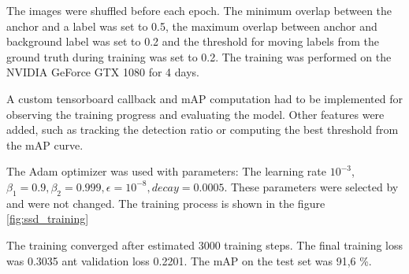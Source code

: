 \documentclass[a4paper,11pt,titlepage,twoside]{article}
\numberwithin{figure}{section}
\begin{document}
The images were shuffled before each epoch. The minimum overlap between the anchor and a label was set to 0.5, the maximum overlap between anchor and background label was set to 0.2 and the threshold for moving labels from the ground truth during training was set to 0.2. The training was performed on the NVIDIA GeForce GTX 1080 for 4 days.

A custom tensorboard callback and mAP computation had to be implemented for observing the training progress and evaluating the model. Other features were added, such as tracking the detection ratio or computing the best threshold from the mAP curve. 

The Adam optimizer \cite{kingma2014adam} was used with parameters: The learning rate $10^{-3}$, $\beta_1 = 0.9, \beta_2 = 0.999, \epsilon=10^{-8}, decay = 0.0005$. These parameters were selected by \cite{ssd_keras} and were not changed. The training process is shown in the figure \ref{fig:ssd_training}

The training converged after estimated 3000 training steps. The final training loss was 0.3035 ant validation loss 0.2201. The mAP on the test set was 91,6 \%.
\end{document}
